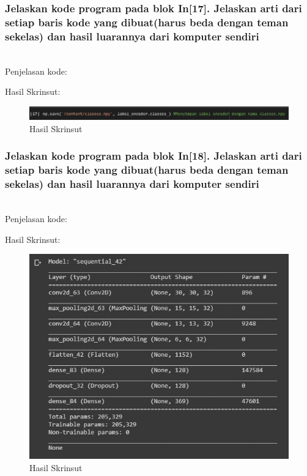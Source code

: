 \subsubsection{Jelaskan kode program pada blok  In[17]. Jelaskan arti dari setiap baris kode yang dibuat(harus beda dengan teman sekelas) dan hasil luarannya dari komputer sendiri}
\hfill\\
Penjelasan kode:

Hasil Skrinsut:
\begin{figure}[H]
	\centering
	\includegraphics[scale=0.5]{figures/1174083/figures7/p17.png}
	\caption{Hasil Skrinsut}
\end{figure}


\subsubsection{Jelaskan kode program pada blok In[18]. Jelaskan arti dari setiap baris kode yang dibuat(harus beda dengan teman sekelas) dan hasil luarannya dari komputer sendiri}
\hfill\\Penjelasan kode:

Hasil Skrinsut:
\begin{figure}[H]
	\centering
	\includegraphics[scale=0.5]{figures/1174083/figures7/p18.png}
	\caption{Hasil Skrinsut}
\end{figure}



